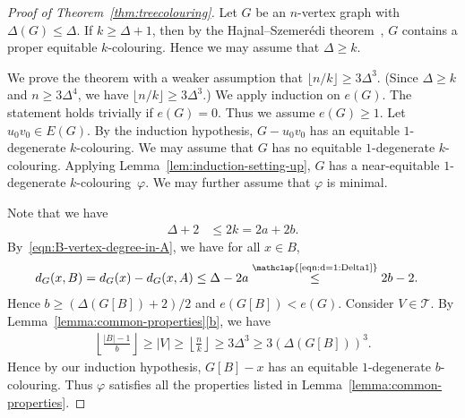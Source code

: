\documentclass[11pt]{article}
\theoremstyle{plain}
\numberwithin{equation}{section}
\begin{document}
\begin{proof}[Proof of Theorem~\ref{thm:treecolouring}]
Let $G$ be an $n$-vertex graph with $\Delta(G) \le \Delta$.
If $k \ge \Delta +1$, then by the Hajnal--Szemer\'{e}di theorem~\cite{HS1970},
$G$ contains a  proper equitable $k$-colouring.
Hence we may assume that $\Delta \ge k$.
	
We prove the theorem with a weaker assumption that $\lfloor n/k \rfloor \ge 3\Delta^3$.
(Since $\Delta \ge k$ and $n \ge 3 \Delta^4$, we have $\lfloor n/k \rfloor \ge 3\Delta^3$.)
We apply induction on $e(G)$. The statement  holds trivially if $e(G)=0$.
		Thus we assume $e(G) \ge 1$.
		Let $u_0v_0\in E(G)$.
		By the induction hypothesis, $G-u_0v_0$ has an equitable $1$-degenerate $k$-colouring.
		We may assume that $G$ has no	equitable $1$-degenerate $k$-colouring.
		Applying Lemma~\ref{lem:induction-setting-up}, $G$ has a near-equitable $1$-degenerate $k$-colouring~$\varphi$.
		We may further assume that $\varphi$ is minimal.
	
Note that we have
	\begin{align}
     \Delta+2  &\le  2k = 2a+2b.
           \label{eqn:d=1:Delta1}
        \end{align}
By~\eqref{eqn:B-vertex-degree-in-A}, we have for all $x \in B$,
	\begin{align*}
		d_G(x, B) &= d_G(x) - d_G(x, A) \le \Delta - 2a  \overset{\mathclap{\text{\eqref{eqn:d=1:Delta1}}}}{\le} 2b-2.
	\end{align*}
    Hence $b \ge (\Delta(G[B])+2)/2$ and $e(G[B]) < e(G)$.
		Consider $V \in \mathcal{T}$.
		By Lemma~\ref{lemma:common-properties}\ref{b}, we have
    \begin{align*}
    \left\lfloor \frac{|B|-1}b  \right\rfloor \ge |V| \ge \left\lfloor \frac{n}{k} \right\rfloor \ge 3\Delta^3 \geq 3 (\Delta(G[B]))^3.
    \end{align*}
	Hence by our induction hypothesis, $G[B ]-x$ has  an equitable $1$-degenerate $b$-colouring.
Thus $\varphi$ satisfies all the properties listed in Lemma~\ref{lemma:common-properties}.


\end{proof}
\end{document}

